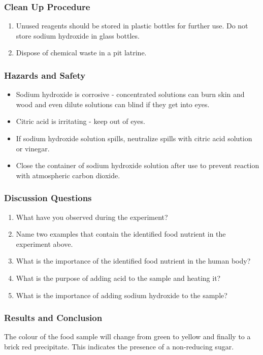 \subsubsection*{Clean Up Procedure}
\begin{enumerate}
\item{Unused reagents should be stored in plastic bottles for further use. Do not store sodium hydroxide in glass bottles.}
\item{Dispose of chemical waste in a pit latrine.}
\end{enumerate}

\subsubsection*{Hazards and Safety}
\begin{itemize}
\item{Sodium hydroxide is corrosive - concentrated solutions can burn skin and wood and even dilute solutions can blind if they get into eyes.}
\item{Citric acid is irritating - keep out of eyes.}
\item{If sodium hydroxide solution spills, neutralize spills with citric acid solution or vinegar.}
\item{Close the container of sodium hydroxide solution after use to prevent reaction with atmospheric carbon dioxide.}
\end{itemize}

\subsubsection*{Discussion Questions}
\begin{enumerate}
\item{What have you observed during the experiment?}
\item{Name two examples that contain the identified food nutrient in the experiment above.}
\item{What is the importance of the identified food nutrient in the human body?}
\item{What is the purpose of adding acid to the sample and heating it?}
\item{What is the importance of adding sodium hydroxide to the sample?}
\end{enumerate}

\subsubsection*{Results and Conclusion}
The colour of the food sample will change from green to yellow and finally to a brick red precipitate. This indicates the presence of a non-reducing sugar.

